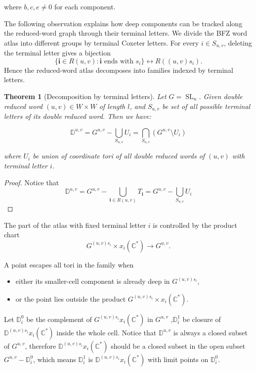 \documentclass[12pt]{amsart}
\newcommand{\C}{\mathbb C}
\newcommand{\D}{\mathbb D}
\newcommand{\SL}{\operatorname{SL}}
\newcommand{\bi}{\mathbf i}
\theoremstyle{plain}
\newtheorem{theorem}{Theorem}[section]
\theoremstyle{definition}
\theoremstyle{remark}
\begin{document}
where $b,c,e \neq 0$ for each component.

\medskip

The following observation explains how deep components can be tracked along the reduced-word graph through their terminal letters. We divide the BFZ word atlas into different groups by terminal Coxeter letters. For every $i\in S_{u,v}$, deleting the terminal letter gives a
bijection
\[
\{
\mathbf i\in R(u,v):\mathbf i\text{ ends with }s_i
\}
\longleftrightarrow
R((u,v)s_i).
\]
Hence the reduced-word atlas decomposes into families indexed by
terminal letters. 

\begin{theorem}[Decomposition by terminal letters]
Let $G=\SL_n$. Given double reduced word $(u,v)\in W\times W$ of length $l$, and $S_{u,v}$ be set of all possible terminal letters of its double reduced word. Then we have:

\[
\D^{u,v}=G^{u,v}-\bigcup_{S_{u,v}} U_i=\bigcap_{S_{u,v}} (G^{u,v}\setminus U_i)
\]

where $U_i$ be union of coordinate tori of all double reduced words of $(u,v)$ with terminal letter $i$.

\end{theorem}
\begin{proof}
   Notice that
\[
\D^{u,v}=G^{u,v}- \bigcup_{\bi\in R(u,v)} T_\bi =G^{u,v}-\bigcup_{S_{u,v}} U_i
\]
\end{proof}

The part of the atlas with fixed terminal letter $i$ is controlled by the product chart
\[
G^{(u,v)s_i}\times x_i(\mathbb C^*)
\longrightarrow
G^{u,v}.
\]

A point escapes all tori in the family when 

\begin{itemize}
   
   \item either its smaller-cell component is already deep in $G^{(u,v)s_i}$, 
   \item or the point lies outside the product $G^{(u,v)s_i}\times x_i(\mathbb C^*)$. 
   
\end{itemize}

Let $\D^{0}_i$ be the complement of $G^{(u,v)s_i}x_i(\C^*)$ in $G^{u,v}$ ,$\D^1_i$ be closure of $\D^{(u,v)s_i}x_i(\C^*)$ inside the whole cell. Notice that $\D^{u,v}$ is always a closed subset of $G^{u,v}$, therefore $\D^{(u,v)s_i}x_i(\C^*)$ should be a closed subset in the open subset $G^{u,v}-\D_i^{0}$, which means $\D^1_i$ is $\D^{(u,v)s_i}x_i(\C^*)$ with limit points on $\D_i^{0}$.
\end{document}
